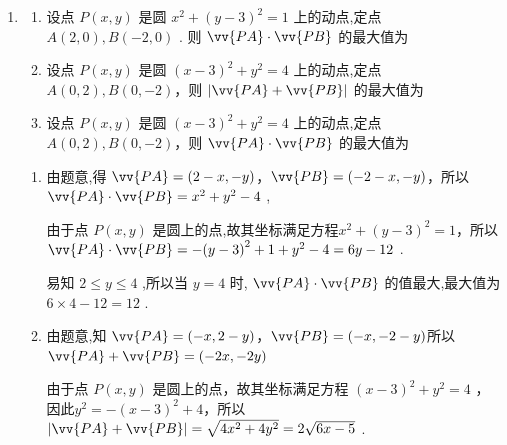 \begin{enumerate}
\begin{enumerate}
\begin{jieda}
            $\because P\left( {x,y}\right)$ 是圆 ${\left( x - 2\right) }^{2} + {y}^{2} = 1$ 上的任意一点，$\therefore {\left( x - 5\right) }^{2} + {\left( y + 4\right) }^{2}$ 的最大值为圆心$(2,0)$到$(5, -4)$的距离与半径之和的平方，即 ${\left\lbrack  {\left( x - 5\right) }^{2} + {\left( y + 4\right) }^{2}\right\rbrack  }_{\max } = {\left\lbrack  \sqrt{{\left( 2 - 5\right) }^{2} + {\left( 0 + 4\right) }^{2}} + 1\right\rbrack  }^{2} = {36}$ .
        \end{jieda} 
        \item 
        \begin{enumerate}  
            \item 设点 $P\left( {x,y}\right)$ 是圆 ${x}^{2} + {\left( y - 3\right) }^{2} = 1$ 上的动点,定点 $A\left( {2,0}\right) ,B\left( {-2,0}\right)$ . 则 $\vv{PA} \cdot  \vv{PB}$ 的最大值为
            \item 设点 $P\left( {x,y}\right)$ 是圆 ${\left( x - 3\right) }^{2} + {y}^{2} = 4$ 上的动点,定点 $A\left( {0,2}\right) ,B\left( {0, - 2}\right)$，则 $\left| {\vv{PA} + \vv{PB}}\right|$ 的最大值为
            \item 设点 $P\left( {x,y}\right)$ 是圆 ${\left( x - 3\right) }^{2} + {y}^{2} = 4$ 上的动点,定点 $A\left( {0,2}\right) ,B\left( {0, - 2}\right)$，则 $\vv{PA} \cdot  \vv{PB}$ 的最大值为
        \end{enumerate}
        
        \begin{jieda}
            \begin{enumerate}
                \item 由题意,得 $\vv{PA} = \left( {2 - x, - y}\right)$，$\vv{PB} = \left( {-2 - x, - y}\right)$，所以 $\vv{PA} \cdot  \vv{PB} = {x}^{2} + {y}^{2} - 4$ ,
                
                由于点 $P\left( {x,y}\right)$ 是圆上的点,故其坐标满足方程${x}^{2} + {\left( y - 3\right) }^{2} = 1$，所以 $\vv{PA} \cdot  \vv{PB} =  - {\left( y - 3\right) }^{2} + 1 + {y}^{2} - 4 = {6y} - {12}$ .
                
                易知 $2 \leq  y \leq  4$ ,所以当 $y = 4$ 时, $\vv{PA} \cdot  \vv{PB}$ 的值最大,最大值为 $6 \times  4 - {12} = {12}$ .
                \item 由题意,知 $\vv{PA} = \left( {-x,2 - y}\right)$，$\vv{PB} = \left( {-x, - 2 - y}\right)$所以 $\vv{PA} + \vv{PB} = \left( {-{2x}, - {2y}}\right)$
                
                由于点 $P\left( {x,y}\right)$ 是圆上的点，故其坐标满足方程 ${\left( x - 3\right) }^{2} + {y}^{2} = 4$ ，因此${y}^{2} =  - {\left( x - 3\right) }^{2} + 4$，所以 $\left| {\vv{PA} + \vv{PB}}\right|  = \sqrt{4{x}^{2} + 4{y}^{2}} = 2\sqrt{{6x} - 5}$ .
                

\end{enumerate}
\end{jieda}
\end{enumerate}
\end{enumerate}
